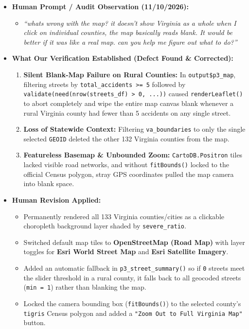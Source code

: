 \documentclass[
  letterpaper,
  DIV=11,
  numbers=noendperiod]{scrartcl}
\providecommand{\tightlist}{%
  \setlength{\itemsep}{0pt}\setlength{\parskip}{0pt}}
\begin{document}
\begin{itemize}
\tightlist
\item
  \textbf{Human Prompt / Audit Observation (11/10/2026):}

  \begin{itemize}
  \tightlist
  \item
    \emph{``whats wrong with the map? it doesn't show Virginia as a
    whole when I click on individual counties, the map basically reads
    blank. It would be better if it was like a real map. can you help me
    figure out what to do?''}
  \end{itemize}
\item
  \textbf{What Our Verification Established (Defect Found \&
  Corrected):}

  \begin{enumerate}
  \def\labelenumi{\arabic{enumi}.}
  \tightlist
  \item
    \textbf{Silent Blank-Map Failure on Rural Counties:} In
    \texttt{output\$p3\_map}, filtering streets by
    \texttt{total\_accidents\ \textgreater{}=\ 5} followed by
    \texttt{validate(need(nrow(streets\_df)\ \textgreater{}\ 0,\ ...))}
    caused \texttt{renderLeaflet()} to abort completely and wipe the
    entire map canvas blank whenever a rural Virginia county had fewer
    than 5 accidents on any single street.
  \item
    \textbf{Loss of Statewide Context:} Filtering
    \texttt{va\_boundaries} to only the single selected \texttt{GEOID}
    deleted the other 132 Virginia counties from the map.
  \item
    \textbf{Featureless Basemap \& Unbounded Zoom:}
    \texttt{CartoDB.Positron} tiles lacked visible road networks, and
    without \texttt{fitBounds()} locked to the official Census polygon,
    stray GPS coordinates pulled the map camera into blank space.
  \end{enumerate}
\item
  \textbf{Human Revision Applied:}

  \begin{itemize}
  \tightlist
  \item
    Permanently rendered all 133 Virginia counties/cities as a clickable
    choropleth background layer shaded by \texttt{severe\_ratio}.
  \item
    Switched default map tiles to \textbf{OpenStreetMap (Road Map)} with
    layer toggles for \textbf{Esri World Street Map} and \textbf{Esri
    Satellite Imagery}.
  \item
    Added an automatic fallback in \texttt{p3\_street\_summary()} so if
    \texttt{0} streets meet the slider threshold in a rural county, it
    falls back to all geocoded streets (\texttt{min\ =\ 1}) rather than
    blanking the map.
  \item
    Locked the camera bounding box (\texttt{fitBounds()}) to the
    selected county's \texttt{tigris} Census polygon and added a
    \texttt{"Zoom\ Out\ to\ Full\ Virginia\ Map"} button.
  \end{itemize}
\end{itemize}
\end{document}
